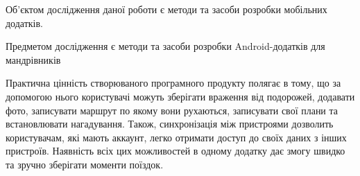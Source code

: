 \documentclass[../main.tex]{subfiles}
\begin{document}
Об'єктом дослідження даної роботи є методи та засоби розробки мобільних додатків. 

Предметом дослідження є методи та засоби розробки Android-додатків для мандрівників

Практична цінність створюваного програмного продукту полягає в тому, що за допомогою нього користувачі можуть зберігати враження від подорожей, додавати фото, записувати маршрут по якому вони рухаються, записувати свої плани та встановлювати нагадування. Також, синхронізація між пристроями дозволить користувачам, які мають аккаунт, легко отримати доступ до своїх даних з інших пристроїв. Наявність всіх цих можливостей в одному додатку дає змогу швидко та зручно зберігати моменти поїздок.

\end{document}

